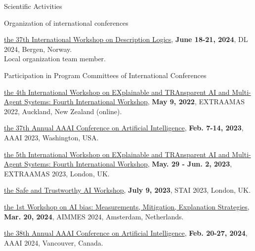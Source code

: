 \documentclass{resume} %
\begin{document}

    \begin{rSection}{Scientific Activities}

        \begin{rSubsection}{Organization of international conferences}{}{}{}
            \item \href{https://dl2024.w.uib.no/organization/}{the 37th International Workshop on Description Logics}, \textbf{June 18-21, 2024}, DL 2024, Bergen, Norway.
            \\Local organization team member.
        \end{rSubsection}


        \begin{rSubsection}{Participation in Program Committees of International Conferences}{}{}{}
            \item \href{https://extraamas.ehealth.hevs.ch/archive.html#organizations-2022}{the 4th International Workshop on EXplainable and TRAnsparent AI and Multi-Agent Systems: Fourth International Workshop}, \textbf{May 9, 2022}, EXTRAAMAS 2022, Auckland, New Zealand (online).
            \item \href{https://apice.unibo.it/xwiki/bin/view/Event/Aaai2023}{the 37th Annual AAAI Conference on Artificial Intelligence}, \textbf{Feb. 7-14, 2023}, AAAI 2023, Washington, USA.
            \item \href{https://apice.unibo.it/xwiki/bin/view/Event/Prima2023}{the 5th International Workshop on EXplainable and TRAnsparent AI and Multi-Agent Systems: Fourth International Workshop}, \textbf{May. 29 - Jun. 2, 2023}, EXTRAAMAS 2023, London, UK.
            \item \href{https://web.archive.org/web/20240225110652/https://www.stai.uk/stai-23-iclp}{the Safe and Trustworthy AI Workshop}, \textbf{July 9, 2023}, STAI 2023, London, UK.
            \item \href{https://fairnesscluster.github.io/aimmes23.github.io/index.html}{the 1st Workshop on AI bias: Measurements, Mitigation, Explanation Strategies}, \textbf{Mar. 20, 2024}, AIMMES 2024, Amsterdam, Netherlands.
            \item \href{https://apice.unibo.it/xwiki/bin/view/Event/Aaai2024}{the 38th Annual AAAI Conference on Artificial Intelligence}, \textbf{Feb. 20-27, 2024}, AAAI 2024, Vancouver, Canada.
        \end{rSubsection}


\end{rSection}
\end{document}
